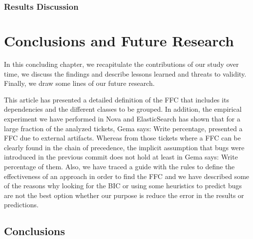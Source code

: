 \documentclass[a4paper, 12pt]{book}
\begin{document}
\subsection{Results Discussion}




\cleardoublepage
\chapter{Conclusions and Future Research}
\label{chap:conclusions}
In this concluding chapter, we recapitulate the contributions of our study over time, we discuss the findings and describe lessons learned and threats to validity. Finally, we draw some lines of our future research.


This article has presented a detailed definition of the FFC that includes its dependencies and the different classes to be grouped. In addition, the empirical experiment we have performed in Nova and ElasticSearch has shown that for a large fraction of the analyzed tickets, Gema says: Write percentage, presented a FFC due to external artifacts. Whereas from those tickets where a FFC can be clearly found in the chain of precedence, the implicit assumption that bugs were introduced in the previous commit does not hold at least in Gema says: Write percentage of them.
Also, we have traced a guide with the rules to define the effectiveness of an approach in order to find the FFC and we have described some of the reasons why looking for the BIC or using some heuristics to predict bugs are not the best option whether our purpose is reduce the error in the results or predictions.

\section{Conclusions}
\end{document}
